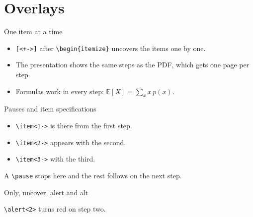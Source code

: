 \documentclass[aspectratio=169]{beamer}
\newcommand{\E}{\mathbb{E}}
\begin{document}
\section{Overlays}
\begin{frame}{One item at a time}
\begin{itemize}[<+->]
\item \texttt{{[}<+->{]}} after \texttt{\textbackslash begin\{itemize\}} uncovers the items one by one.
\item The presentation shows the same steps as the PDF, which gets one page per step.
\item Formulas work in every step: $\E[X]=\sum_{x}x\,p(x)$.
\end{itemize}
\end{frame}

\begin{frame}{Pauses and item specifications}
\begin{itemize}
\item<1-> \texttt{\textbackslash item<1->} is there from the first step.
\item<2-> \texttt{\textbackslash item<2->} appears with the second.
\item<3-> \texttt{\textbackslash item<3->} with the third.
\end{itemize}
A \texttt{\textbackslash pause} stops here \pause and the rest follows on the next step.
\end{frame}

\begin{frame}{Only, uncover, alert and alt}


\alert<2>{\texttt{\textbackslash alert<2>} turns red on step two.}

\end{frame}
\end{document}
